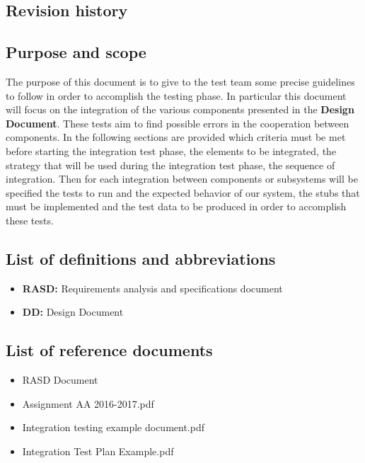 \subsection{Revision history}

\subsection{Purpose	and	scope}
The purpose of this document is to give to the test team some precise guidelines to follow in order to accomplish the testing phase. In particular this document will focus on the integration of the various components presented in the \textbf{Design Document}.
These tests aim to find possible errors in the cooperation between components.
In the following sections are provided which criteria must be met before starting the integration test phase, the elements to be integrated, the strategy that will be used during the integration test phase, the sequence of integration.
Then for each integration between components or subsystems will be specified the tests to run and the expected behavior of our system, the stubs that must be implemented and the test data to be produced in order to accomplish these tests.

\subsection{List of	definitions	and	abbreviations}
\begin{itemize}
\item \textbf{RASD:} Requirements analysis and specifications document
\item \textbf{DD:} Design Document 
\end{itemize}


\subsection{List of reference documents}

\begin{itemize}
\item RASD Document
\item Assignment AA 2016-2017.pdf
\item Integration testing example document.pdf
\item Integration Test Plan Example.pdf
\end{itemize}
















